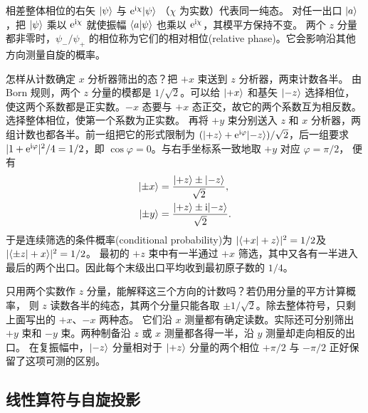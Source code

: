 \begin{corollary}
    相差整体相位的右矢 $\lvert\psi\rangle$ 与 $\mathop{}\!\mathrm{e}^{\mathrm{i}\chi}\lvert\psi\rangle$ （$\chi$ 为实数）代表同一纯态。
    对任一出口 $\lvert a\rangle$，把 $\lvert\psi\rangle$ 乘以 $\mathop{}\!\mathrm{e}^{\mathrm{i}\chi}$ 就使振幅 $\langle a\vert\psi\rangle$ 也乘以 $\mathop{}\!\mathrm{e}^{\mathrm{i}\chi}$，其模平方保持不变。
    两个 $z$ 分量都非零时，$\psi_-/\psi_+$ 的相位称为它们的相对相位(relative phase)。它会影响沿其他方向测量自旋的概率。
\end{corollary}

怎样从计数确定 $x$ 分析器筛出的态？把 $+x$ 束送到 $z$ 分析器，两束计数各半。
由 Born 规则，两个 $z$ 分量的模都是 $1/\sqrt2$。可以给 $\lvert+x\rangle$ 和基矢 $\lvert-z\rangle$ 选择相位，
使这两个系数都是正实数。$-x$ 态要与 $+x$ 态正交，故它的两个系数互为相反数。选择整体相位，使第一个系数为正实数。
再将 $+y$ 束分别送入 $z$ 和 $x$ 分析器，两组计数也都各半。前一组把它的形式限制为
$(\lvert+z\rangle + \mathop{}\!\mathrm{e}^{\mathrm{i}\varphi}\lvert-z\rangle)/\sqrt2$，后一组要求
$\lvert1 + \mathop{}\!\mathrm{e}^{\mathrm{i}\varphi}\rvert^2/4 = 1/2$，即 $\cos\varphi = 0$。与右手坐标系一致地取 $+y$ 对应 $\varphi = \pi/2$，
便有
\begin{subequations}
    \begin{align}
        \lvert\pm x\rangle &= \frac{\lvert+z\rangle \pm \lvert-z\rangle}{\sqrt2},\\
        \lvert\pm y\rangle &= \frac{\lvert+z\rangle \pm \mathrm{i}\lvert-z\rangle}{\sqrt2}.
    \end{align}
\end{subequations}
于是连续筛选的条件概率(conditional probability)为
$\lvert\langle+x\vert+z\rangle\rvert^2 = 1/2$及$\lvert\langle\pm z\vert+x\rangle\rvert^2 = 1/2$。
最初的 $+z$ 束中有一半通过 $+x$ 筛选，其中又各有一半进入最后的两个出口。因此每个末级出口平均收到最初原子数的 $1/4$。

只用两个实数作 $z$ 分量，能解释这三个方向的计数吗？若仍用分量的平方计算概率，
则 $z$ 读数各半的纯态，其两个分量只能各取 $\pm1/\sqrt2$。除去整体符号，只剩上面写出的 $+x$、$-x$ 两种态。
它们沿 $x$ 测量都有确定读数。实际还可分别筛出 $+y$ 束和 $-y$ 束。两种制备沿 $z$ 或 $x$ 测量都各得一半，沿 $y$ 测量却走向相反的出口。
在复振幅中，$\lvert-z\rangle$ 分量相对于 $\lvert+z\rangle$ 分量的两个相位 $+\pi/2$ 与 $-\pi/2$ 正好保留了这项可测的区别。

\subsection{线性算符与自旋投影}
\label{ss:spin-operators}

